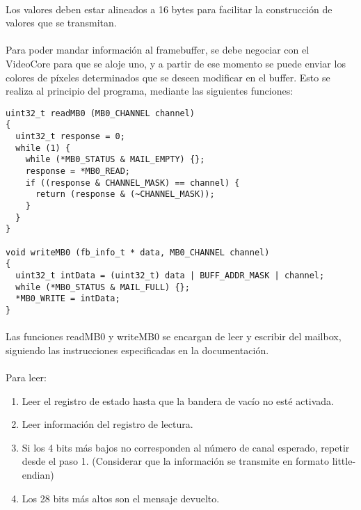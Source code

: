 \documentclass{article}
\begin{document}
\paragraph{}
Los valores deben estar alineados a 16 bytes para facilitar la construcci\'on de valores que se transmitan.

\paragraph{}
Para poder mandar informaci\'on al framebuffer, se debe negociar con el VideoCore para que se aloje uno, y a partir de ese momento se puede enviar los colores de p\'ixeles determinados que se deseen modificar en el buffer. Esto se realiza al principio del programa, mediante las siguientes funciones:

\begin{lstlisting}
uint32_t readMB0 (MB0_CHANNEL channel)
{
  uint32_t response = 0; 
  while (1) {
    while (*MB0_STATUS & MAIL_EMPTY) {};
    response = *MB0_READ;
    if ((response & CHANNEL_MASK) == channel) {
      return (response & (~CHANNEL_MASK));
    }
  }
}

void writeMB0 (fb_info_t * data, MB0_CHANNEL channel)
{
  uint32_t intData = (uint32_t) data | BUFF_ADDR_MASK | channel;
  while (*MB0_STATUS & MAIL_FULL) {};
  *MB0_WRITE = intData;
}
\end{lstlisting}

\paragraph{}
Las funciones readMB0 y writeMB0 se encargan de leer y escribir del mailbox, siguiendo las instrucciones especificadas en la documentaci\'on.\cite{MailboxAccess}

\paragraph{}
Para leer:

\begin{enumerate}
\item Leer el registro de estado hasta que la bandera de vac\'io no est\'e activada.
\item Leer informaci\'on del registro de lectura.
\item Si los 4 bits m\'as bajos no corresponden al n\'umero de canal esperado, repetir desde el paso 1. (Considerar que la informaci\'on se transmite en formato little-endian)
\item Los 28 bits m\'as altos son el mensaje devuelto.
\end{enumerate}
\end{document}
